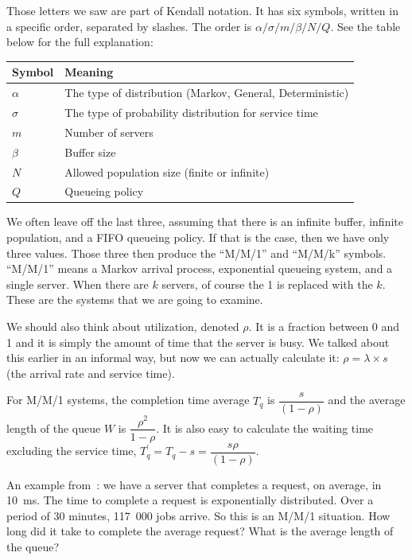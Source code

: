 Those letters we saw are part of Kendall notation. It has six symbols, written in a specific order, separated by slashes. The order is $\alpha / \sigma / m / \beta / N / Q$. See the table below for the full explanation:

\begin{center}
\begin{tabular}{l|l} 
	\textbf{Symbol} & \textbf{Meaning} \\ \hline
	$\alpha$ & The type of distribution (Markov, General, Deterministic) \\ \hline
	$\sigma$ & The type of probability distribution for service time \\ \hline
	$m$ & Number of servers \\ \hline
	$\beta$ & Buffer size \\ \hline
	$N$ & Allowed population size (finite or infinite) \\ \hline
	$Q$ & Queueing policy \\ 
\end{tabular}
\end{center}

We often leave off the last three, assuming that there is an infinite buffer, infinite population, and a FIFO queueing policy. If that is the case, then we have only three values. Those three then produce the ``M/M/1'' and ``M/M/k'' symbols. ``M/M/1'' means a Markov arrival process, exponential queueing system, and a single server. When there are $k$ servers, of course the 1 is replaced with the $k$. These are the systems that we are going to examine.

We should also think about utilization, denoted $\rho$. It is a fraction between 0 and 1 and it is simply the amount of time that the server is busy. We talked about this earlier in an informal way, but now we can actually calculate it: $\rho = \lambda \times s$ (the arrival rate and service time). 

For M/M/1 systems, the completion time average $T_{q}$ is $\dfrac{s}{(1-\rho)}$ and the average length of the queue $W$ is $\dfrac{\rho^{2}}{1-\rho}$. It is also easy to calculate the waiting time excluding the service time, $T^{\prime}_{q} = T_{q} - s = \dfrac{s\rho}{(1-\rho)}$.

An example from~\cite{williams-q}: we have a server that completes a request, on average, in 10~ms. The time to complete a request is exponentially distributed. Over a period of 30 minutes, 117~000 jobs arrive. So this is an M/M/1 situation. How long did it take to complete the average request? What is the average length of the queue?

